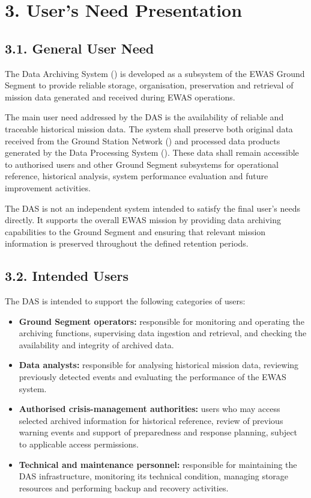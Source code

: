 \section{3. User's Need Presentation}\label{users-needs}

\subsection{3.1. General User Need}\label{general-user-need}

The Data Archiving System () is developed as a subsystem of the EWAS Ground Segment to provide reliable storage, organisation, preservation and retrieval of mission data generated and received during EWAS operations.

The main user need addressed by the DAS is the availability of reliable and traceable historical mission data. The system shall preserve both original data received from the Ground Station Network () and processed data products generated by the Data Processing System (). These data shall remain accessible to authorised users and other Ground Segment subsystems for operational reference, historical analysis, system performance evaluation and future improvement activities.

The DAS is not an independent system intended to satisfy the final user's needs directly. It supports the overall EWAS mission by providing data archiving capabilities to the Ground Segment and ensuring that relevant mission information is preserved throughout the defined retention periods.

\subsection{3.2. Intended Users}\label{intended-users}

The DAS is intended to support the following categories of users:

\begin{itemize}
    \item \textbf{Ground Segment operators:} responsible for monitoring and operating the archiving functions, supervising data ingestion and retrieval, and checking the availability and integrity of archived data.
    \item \textbf{Data analysts:} responsible for analysing historical mission data, reviewing previously detected events and evaluating the performance of the EWAS system.
    \item \textbf{Authorised crisis-management authorities:} users who may access selected archived information for historical reference, review of previous warning events and support of preparedness and response planning, subject to applicable access permissions.
    \item \textbf{Technical and maintenance personnel:} responsible for maintaining the DAS infrastructure, monitoring its technical condition, managing storage resources and performing backup and recovery activities.
\end{itemize}

